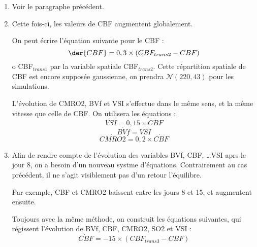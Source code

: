 \begin{enumerate}[label=\textbf{(L\'esion 2 - \arabic*)}]
\item Voir le paragraphe pr\'ec\'edent.
\item Cette fois-ci, les valeurs de CBF augmentent globalement. %

On peut \'ecrire l'\'equation suivante pour le CBF :
\begin{equation}
\der{CBF}=0,3\times \left(CBF_{trans2}-CBF\right)%
\label{cbf_is2}
\end{equation}
o CBF${}_{trans1}$ par la variable spatiale CBF${}_{trans2}$. %
Cette r\'epartition spatiale de CBF est encore suppos\'ee gaussienne, on prendra $\mathcal{N}(220,43)$ pour les simulations.

\par
L'\'evolution de CMRO2, BVf et VSI s'effectue dans le m\^eme sens, et  la m\^eme vitesse que celle de CBF. On utilisera les \'equations :
\begin{equation}
\dot{VSI}=0,15\times\dot{CBF}
\label{vsi_is2_tr}
\end{equation}
\begin{equation}
\dot{BVf}=\dot{VSI}
\label{bvf_is2_tr}
\end{equation}
\begin{equation}
\dot{CMRO2}=0,2\times\dot{CBF}
\label{cmro2_is2_tr}
\end{equation}
\item %
%
Afin de rendre compte de l'\'evolution des variables BVf, CBF, \dots VSI aprs le jour 8, on a besoin d'un nouveau systme d'\'equations. %
Contrairement au cas pr\'ec\'edent, il ne s'agit visiblement pas d'un retour  l'\'equilibre.

\par
Par exemple, CBF et CMRO2 baissent entre les jours 8 et 15, et augmentent ensuite.

\par
Toujours avec la m\^eme m\'ethode, on construit les \'equations suivantes, %
qui r\'egissent l'\'evolution de BVf, CBF, CMRO2, SO2 et VSI :
\begin{equation}
\dot{CBF}=-15\times\left(CBF_{trans3}-CBF\right)
\end{equation}


\end{enumerate}
